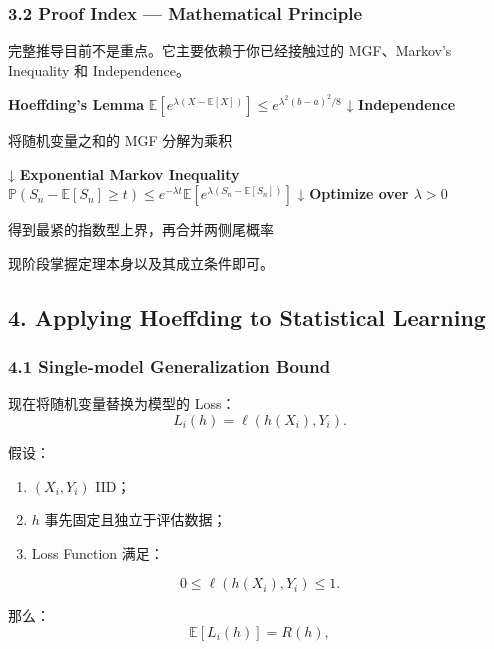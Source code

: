 \hypertarget{part-2-14-0001-proof-index-mathematical-principle}{%
\subsubsection{3.2 Proof Index --- Mathematical Principle}\label{part-2-14-0001-proof-index-mathematical-principle}}

完整推导目前不是重点。它主要依赖于你已经接触过的 MGF、Markov's Inequality 和 Independence。

\textbf{Hoeffding's Lemma} \(\mathbb E[e^{\lambda(X-\mathbb E[X])}]\leq e^{\lambda^2(b-a)^2/8}\) ↓ \textbf{Independence}

将随机变量之和的 MGF 分解为乘积

↓ \textbf{Exponential Markov Inequality} \(\mathbb P(S_n-\mathbb E[S_n]\geq t)\leq e^{-\lambda t}\mathbb E[e^{\lambda(S_n-\mathbb E[S_n])}]\) ↓ \textbf{Optimize over \(\lambda>0\)}

得到最紧的指数型上界，再合并两侧尾概率

现阶段掌握定理本身以及其成立条件即可。

\hypertarget{part-2-14-0001-applying-hoeffding-to-statistical-learning}{%
\subsection{4. Applying Hoeffding to Statistical Learning}\label{part-2-14-0001-applying-hoeffding-to-statistical-learning}}

\hypertarget{part-2-14-0001-single-model-generalization-bound}{%
\subsubsection{4.1 Single-model Generalization Bound}\label{part-2-14-0001-single-model-generalization-bound}}

现在将随机变量替换为模型的 Loss：
\[L_i(h)=\ell(h(X_i),Y_i).\]

假设：

\begin{enumerate}
\def\labelenumi{\arabic{enumi}.}
\tightlist
\item
  \((X_i,Y_i)\) IID；
\item
  \(h\) 事先固定且独立于评估数据；
\item
  Loss Function 满足：
\end{enumerate}

\[0\leq\ell(h(X_i),Y_i)\leq1.\]

那么：
\[\mathbb E[L_i(h)]=R(h),\]

